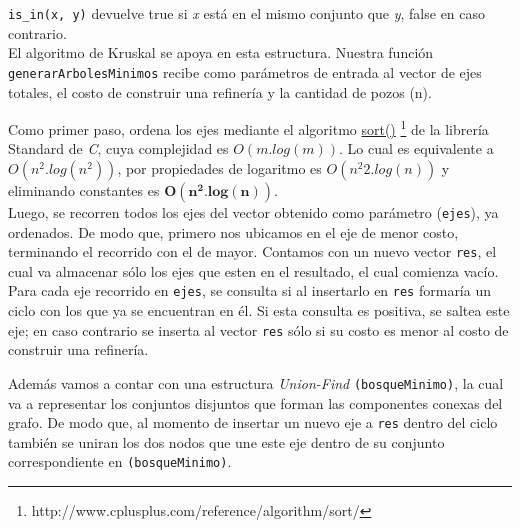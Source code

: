 \texttt{is_in(x, y)} devuelve true si \emph{x} est\'a en el mismo conjunto que \emph{y}, false en caso contrario. \\


El algoritmo de Kruskal se apoya en esta estructura. Nuestra funci\'on \texttt{generarArbolesMinimos} recibe como par\'ametros de entrada al vector de ejes totales, el costo de construir una refiner\'ia y la cantidad de pozos (n).


Como primer paso, ordena los ejes mediante el algoritmo  \href{http://www.cplusplus.com/reference/algorithm/sort/}{sort()} \footnote{http://www.cplusplus.com/reference/algorithm/sort/} de la librer\'ia Standard de \emph{C}, cuya complejidad es $O(m.log(m))$. Lo cual es equivalente a $O(n^2.log(n^2))$, por propiedades de logaritmo es $O(n^{2}2.log(n))$ y eliminando constantes es $\mathbf{O(n^2.log(n))}$. \\

	
Luego, se recorren todos los ejes del vector obtenido como par\'ametro (\texttt{ejes}), ya ordenados. De modo que, primero nos ubicamos en el eje de menor costo, terminando el recorrido con el de mayor. Contamos con un nuevo vector \texttt{res}, el cual va almacenar s\'olo los ejes que esten en el resultado, el cual comienza vac\'io. Para cada eje recorrido en \texttt{ejes}, se consulta si al insertarlo en \texttt{res} formar\'ia un ciclo con los que ya se encuentran en \'el. Si esta consulta es positiva, se saltea este eje; en caso contrario se inserta al vector \texttt{res} s\'olo si su costo es menor al costo de construir una refiner\'ia. 	


Adem\'as vamos a contar con una estructura \emph{Union-Find} \texttt{(bosqueMinimo)}, la cual va a representar los conjuntos disjuntos que forman las componentes conexas del grafo. De modo que, al momento de insertar un nuevo eje a \texttt{res} dentro del ciclo tambi\'en se uniran los dos nodos que une este eje dentro de su conjunto correspondiente en \texttt{(bosqueMinimo)}.\\
	
